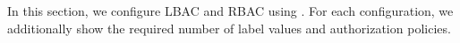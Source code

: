 

\label{sec:configuration}
In this section, we configure LBAC \cite{lbac} and RBAC \cite{rbac}  using \labacOneOneOne{}. For each configuration, we additionally show the required number of label values and authorization policies. 


 



%
